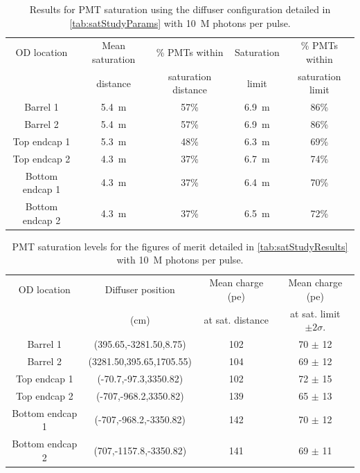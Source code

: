 \documentclass[a4paper,11pt]{article}
\begin{document}
\begin{table}[ht!]
    \centering
    \begin{tabular}{|c|c|c|c|c|}
    \hline
        OD location & Mean saturation & \% PMTs within & Saturation  & \% PMTs within \\
                    &  distance & saturation distance & limit &  saturation limit\\
        \hline
        Barrel 1        & 5.4~m  & 57\%       & 6.9~m   & 86\% \\
        Barrel 2        & 5.4~m  & 57\%       & 6.9~m   & 86\% \\
		Top endcap 1    & 5.3~m  & 48\%       & 6.3~m & 69\% \\
        Top endcap 2    & 4.3~m  & 37\%       & 6.7~m & 74\% \\ 
		Bottom endcap 1 & 4.3~m  & 37\%       & 6.4~m & 70\% \\
		Bottom endcap 2 & 4.3~m  & 37\%       & 6.5~m & 72\% \\
        \hline
    \end{tabular}
    \caption{Results for PMT saturation using the diffuser configuration detailed in \cref{tab:satStudyParams} with 10~M photons per pulse.}
    \label{tab:satStudyResults10M}
\end{table}
%
\begin{table}[ht!]
    \centering
    \begin{tabular}{|c|c|c|c|}
    \hline
        OD location &Diffuser position & Mean charge (pe)   & Mean charge (pe)    \\
                    &  (cm)                & at sat. distance & at sat. limit $\pm2\sigma$.  \\
        \hline
        Barrel 1       & (395.65,-3281.50,8.75)   & 102  & 70 $\pm$ 12 \\ 
        Barrel 2       & (3281.50,395.65,1705.55) & 104  & 69 $\pm$ 12 \\ 
        Top endcap 1   & (-70.7,-97.3,3350.82)    & 102  & 72 $\pm$ 15 \\
        Top endcap 2   & (-707,-968.2,3350.82)    & 139  & 65 $\pm$ 13 \\
        Bottom endcap 1 & (-707,-968.2,-3350.82)  & 142  & 70 $\pm$ 12 \\ 
        Bottom endcap 2 & (707,-1157.8,-3350.82)  & 141  & 69 $\pm$ 11 \\ 
        \hline
    \end{tabular}
    \caption{PMT saturation levels for the figures of merit detailed in \cref{tab:satStudyResults} with 10~M photons per pulse.}
    \label{tab:satStudyResults10M_pevalues}
\end{table}
\end{document}
